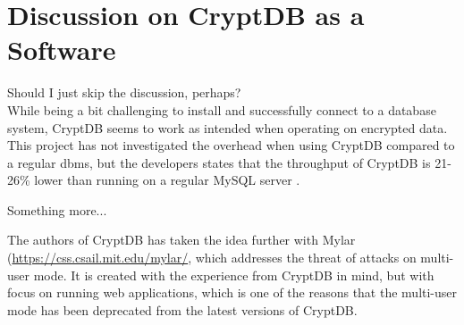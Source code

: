 \section{Discussion on CryptDB as a Software}

Should I just skip the discussion, perhaps? \\

While being a bit challenging to install and successfully connect to a database system, CryptDB seems to work as intended when operating on encrypted data. This project has not investigated the overhead when using CryptDB compared to a regular \gls{dbms}, but the developers states that the throughput of CryptDB is 21-26\% lower than running on a regular MySQL server \citep{CryptDB_Main_Paper}. 

Something more...

The authors of CryptDB has taken the idea further with Mylar (\url{https://css.csail.mit.edu/mylar/}, which addresses the threat of attacks on multi-user mode. It is created with the experience from CryptDB in mind, but with focus on running web applications, which is one of the reasons that the multi-user mode has been deprecated from the latest versions of CryptDB.